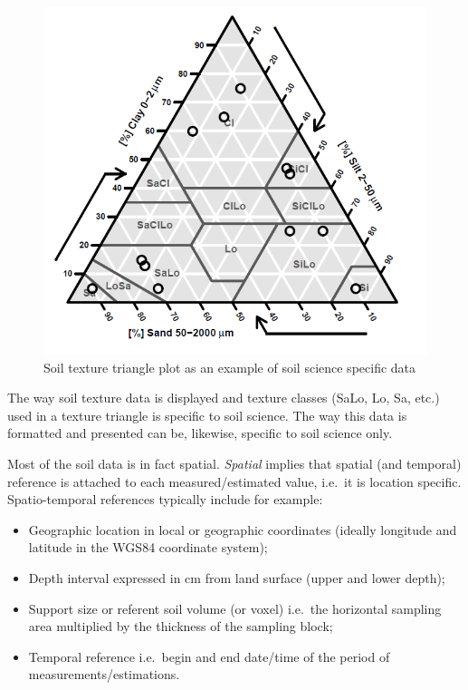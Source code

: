 \documentclass[10pt,b5paper,]{book}
\providecommand{\tightlist}{%
  \setlength{\itemsep}{0pt}\setlength{\parskip}{0pt}}
\theoremstyle{definition}
\theoremstyle{definition}
\theoremstyle{definition}
\theoremstyle{remark}
\begin{document}
\begin{figure}
\centering
\includegraphics{images/Data_sharing_triangle.png}
\caption{Soil texture triangle plot as an example of soil science
specific data}
\end{figure}

The way soil texture data is displayed and texture classes (SaLo, Lo,
Sa, etc.) used in a texture triangle is specific to soil science. The
way this data is formatted and presented can be, likewise, specific to
soil science only.

Most of the soil data is in fact spatial. \emph{Spatial} implies that
spatial (and temporal) reference is attached to each measured/estimated
value, i.e.~it is location specific. Spatio-temporal references
typically include for example:

\begin{itemize}
\tightlist
\item
  Geographic location in local or geographic coordinates (ideally
  longitude and latitude in the WGS84 coordinate system);
\item
  Depth interval expressed in cm from land surface (upper and lower
  depth);
\item
  Support size or referent soil volume (or voxel) i.e.~the horizontal
  sampling area multiplied by the thickness of the sampling block;
\item
  Temporal reference i.e.~begin and end date/time of the period of
  measurements/estimations.
\end{itemize}
\end{document}
